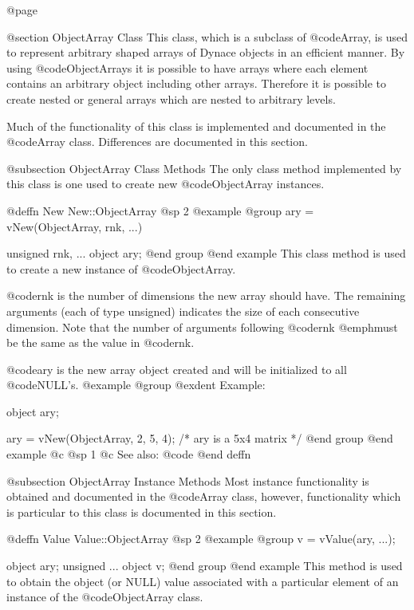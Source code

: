 @page

@section  ObjectArray Class
This class, which is a subclass of @code{Array}, is used to represent
arbitrary shaped arrays of Dynace objects in an efficient manner.  By
using @code{ObjectArray}s it is possible to have arrays where each
element contains an arbitrary object including other arrays.
Therefore it is possible to create nested or general arrays which are
nested to arbitrary levels.


Much of the functionality of this class is implemented and documented in
the @code{Array} class.  Differences are documented in this section.



@subsection ObjectArray Class Methods
The only class method implemented by this class is one used to create
new @code{ObjectArray} instances.






@deffn {New} New::ObjectArray
@sp 2
@example
@group
ary = vNew(ObjectArray, rnk, ...)

unsigned  rnk, ...
object    ary;
@end group
@end example
This class method is used to create a new instance of @code{ObjectArray}.

@code{rnk} is the number of dimensions the new array should have.
The remaining arguments (each of type unsigned) indicates the size of
each consecutive dimension.  Note that the number of arguments following
@code{rnk} @emph{must} be the same as the value in @code{rnk}.

@code{ary} is the new array object created and will be initialized to all
@code{NULL}'s.
@example
@group
@exdent Example:

object  ary;

ary = vNew(ObjectArray, 2, 5, 4);
/*  ary is a 5x4 matrix  */
@end group
@end example
@c @sp 1
@c See also:  @code{}
@end deffn



@subsection ObjectArray Instance Methods
Most instance functionality is obtained and documented in the @code{Array}
class, however, functionality which is particular to this class is documented
in this section.





@deffn {Value} Value::ObjectArray
@sp 2
@example
@group
v = vValue(ary, ...);

object    ary;
unsigned  ...
object    v;
@end group
@end example
This method is used to obtain the object (or NULL) value associated with a
particular element of an instance of the @code{ObjectArray} class.

